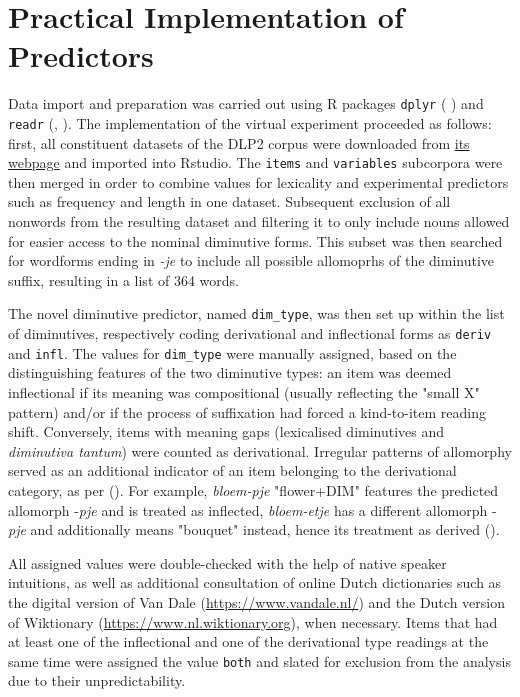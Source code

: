 \section{Practical Implementation of Predictors}
\label{sec:4-implementation}
Data import and preparation was carried out using R packages \texttt{dplyr} (\citeauthor{dplyr+2022} \citeyear{dplyr+2022}) and \texttt{readr} (\citeauthor{readr+2022}, \citeyear{readr+2022}). The implementation of the virtual experiment proceeded as follows: first, all constituent datasets of the DLP2 corpus were downloaded from \href{http://crr.ugent.be/archives/1796}{its webpage} and imported into Rstudio. The \texttt{items} and \texttt{variables} subcorpora were then merged in order to combine values for lexicality and experimental predictors such as frequency and length in one dataset. Subsequent exclusion of all nonwords from the resulting dataset and filtering it to only include nouns allowed for easier access to the nominal diminutive forms. This subset was then searched for wordforms ending in \textit{-je} to include all possible allomoprhs of the diminutive suffix, resulting in a list of 364 words.

The novel diminutive predictor, named \texttt{dim\_type}, was then set up within the list of diminutives, respectively coding derivational and inflectional forms as \texttt{deriv} and \texttt{infl}. The values for \texttt{dim\_type} were manually assigned, based on the  distinguishing features of the two diminutive types: an item was deemed inflectional if its meaning was compositional (usually reflecting the "small X" pattern) and/or if the process of suffixation had forced a kind-to-item reading shift. Conversely, items with meaning gaps (lexicalised diminutives and \textit{diminutiva tantum}) were counted as derivational. Irregular patterns of allomorphy served as an additional indicator of an item belonging to the derivational category, as per \citeauthor{DeBelder+etal+2009} (\citeyear{DeBelder+etal+2009}). For example, \textit{bloem-pje} "flower+DIM" features the predicted allomorph -\textit{pje} and is treated as inflected, \textit{bloem-etje} has a different allomorph -\textit{pje} and additionally means "bouquet" instead, hence its treatment as derived (\cite{taalportaal}). 

All assigned values were double-checked with the help of native speaker intuitions, as well as additional consultation of online Dutch dictionaries such as the digital version of Van Dale (\url{https://www.vandale.nl/}) and the Dutch version of Wiktionary (\url{https://www.nl.wiktionary.org}), when necessary. Items that had at least one of the inflectional and one of the derivational type readings at the same time were assigned the value \texttt{both} and slated for exclusion from the analysis due to their unpredictability.

